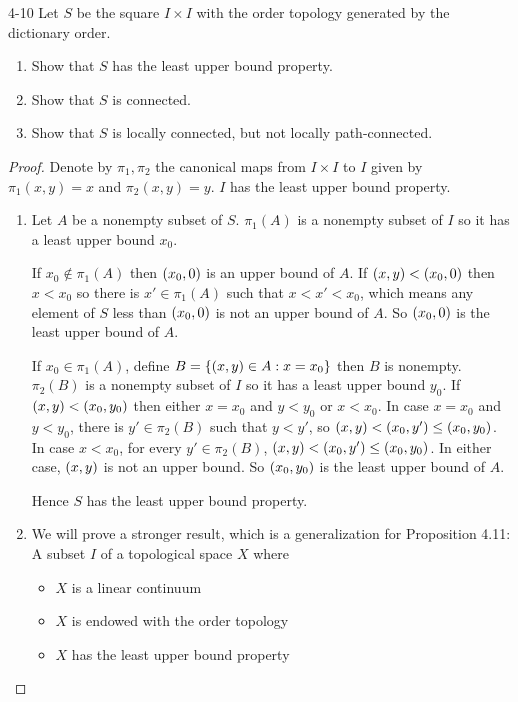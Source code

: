 \begin{problem}{4-10}\label{problem:4-10}
Let $S$ be the square $I\times I$ with the order topology generated by the dictionary order.
\begin{enumerate}[label={(\alph*)}]
	\item Show that $S$ has the least upper bound property.
	\item Show that $S$ is connected.
	\item Show that $S$ is locally connected, but not locally path-connected.
\end{enumerate}
\end{problem}

\begin{proof}
	Denote by $\pi_{1}, \pi_{2}$ the canonical maps from $I\times I$ to $I$ given by $\pi_{1}(x, y) = x$ and $\pi_{2}(x, y) = y$. $I$ has the least upper bound property.
	\begin{enumerate}[label={(\alph*)}]
		\item Let $A$ be a nonempty subset of $S$. $\pi_{1}(A)$ is a nonempty subset of $I$ so it has a least upper bound $x_{0}$.

		      If $x_{0} \notin \pi_{1}(A)$ then $\left({x_{0}, 0}\right)$ is an upper bound of $A$. If $\left({x, y}\right) < \left({x_{0}, 0}\right)$ then $x < x_{0}$ so there is $x' \in \pi_{1}(A)$ such that $x < x' < x_{0}$, which means any element of $S$ less than $\left({x_{0}, 0}\right)$ is not an upper bound of $A$. So $\left({x_{0}, 0}\right)$ is the least upper bound of $A$.

		      If $x_{0} \in \pi_{1}(A)$, define $B = \left\{{ \left({x, y}\right) \in A : x = x_{0} }\right\}$ then $B$ is nonempty. $\pi_{2}(B)$ is a nonempty subset of $I$ so it has a least upper bound $y_{0}$. If $\left({x, y}\right) < \left({x_{0}, y_{0}}\right)$ then either $x = x_{0}$ and $y < y_{0}$ or $x < x_{0}$. In case $x = x_{0}$ and $y < y_{0}$, there is $y' \in \pi_{2}(B)$ such that $y < y'$, so $\left({x, y}\right) < \left({x_{0}, y'}\right) \leq \left({x_{0}, y_{0}}\right)$. In case $x < x_{0}$, for every $y' \in \pi_{2}(B)$, $\left({x, y}\right) < \left({x_{0}, y'}\right) \leq \left({x_{0}, y_{0}}\right)$. In either case, $\left({x, y}\right)$ is not an upper bound. So $\left({x_{0}, y_{0}}\right)$ is the least upper bound of $A$.

		      Hence $S$ has the least upper bound property.
		\item We will prove a stronger result, which is a generalization for Proposition 4.11: A subset $I$ of a topological space $X$ where
		      \begin{itemize}
			      \item $X$ is a linear continuum
			      \item $X$ is endowed with the order topology
			      \item $X$ has the least upper bound property
		      \end{itemize}


\end{enumerate}
\end{proof}
